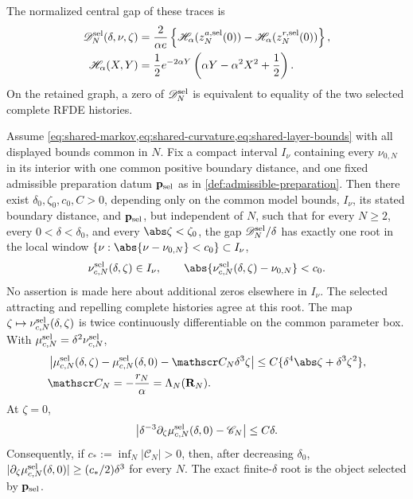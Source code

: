 The normalized central gap of these traces is
\begin{align}
 \mathscr D^{\rm sel}_N(\delta,\nu,\zeta)
  &=\frac{2}{\alpha e}\left\{
    \mathscr H_\alpha(z^{a,\rm sel}_N(0))
   -\mathscr H_\alpha(z^{r,\rm sel}_N(0))\right\},
                                                               \label{eq:shared-gap}\\
 \mathscr H_\alpha(X,Y)
  &=\frac12e^{-2\alpha Y}
    \left(\alpha Y-\alpha^2X^2+\frac12\right).       \label{eq:shared-first-integral}
\end{align}
On the retained graph, a zero of \(\mathscr D^{\rm sel}_N\) is
equivalent to equality of the two selected complete RFDE histories.

\begin{theorem}
\label{thm:shared-resource}
Assume \cref{eq:shared-markov,eq:shared-curvature,eq:shared-layer-bounds}
with all displayed bounds common in \(N\).  Fix a compact interval
\(I_\nu\) containing every \(\nu_{0,N}\) in its
interior with one common positive boundary distance, and one fixed admissible
preparation datum \(\mathbf p_{\rm sel}\) as in
\cref{def:admissible-preparation}.  Then there
exist \(\delta_0,\zeta_0,c_0,C>0\), depending only on the common model
bounds, \(I_\nu\), its stated boundary distance, and
\(\mathbf p_{\rm sel}\), but independent
of \(N\), such that for every \(N\ge2\), every
\(0<\delta<\delta_0\), and every \(\abs\zeta<\zeta_0\), the gap
\(\mathscr D^{\rm sel}_N/\delta\) has exactly one root in the local window
\(\{\nu:\abs{\nu-\nu_{0,N}}<c_0\}\subset I_\nu\),
\begin{equation}
 \nu^{\rm sel}_{c,N}(\delta,\zeta)\in I_\nu,
 \qquad
 \abs{\nu^{\rm sel}_{c,N}(\delta,\zeta)-\nu_{0,N}}<c_0. \label{eq:shared-root}
\end{equation}
No assertion is made here about additional zeros elsewhere in \(I_\nu\).
The selected attracting and repelling complete histories agree at this
root.  The map \(\zeta\mapsto\nu^{\rm sel}_{c,N}(\delta,\zeta)\) is
twice continuously differentiable on the common parameter box.  With
\(\mu^{\rm sel}_{c,N}=\delta^2\nu^{\rm sel}_{c,N}\),
\begin{align}
 &\left|\mu^{\rm sel}_{c,N}(\delta,\zeta)
       -\mu^{\rm sel}_{c,N}(\delta,0)
       -\mathscr C_N\delta^3\zeta\right|
 \le C\{\delta^4\abs\zeta+\delta^3\zeta^2\},        \label{eq:shared-response}\\
 &\mathscr C_N=-\frac{r_N}{\alpha}
 =\Lambda_N(\mathbf R_N).                              \label{eq:shared-coeff}
\end{align}
At \(\zeta=0\),
\begin{equation}
 \left|\delta^{-3}\partial_\zeta
 \mu^{\rm sel}_{c,N}(\delta,0)-\mathscr C_N\right|
 \le C\delta.                                          \label{eq:shared-response-derivative}
\end{equation}
Consequently, if \(c_*:=\inf_N|\mathscr C_N|>0\), then, after decreasing
\(\delta_0\),
\(|\partial_\zeta\mu^{\rm sel}_{c,N}(\delta,0)|
\ge(c_*/2)\delta^3\) for every \(N\).  The exact finite-\(\delta\) root is
the object selected by \(\mathbf p_{\rm sel}\).
\end{theorem}

